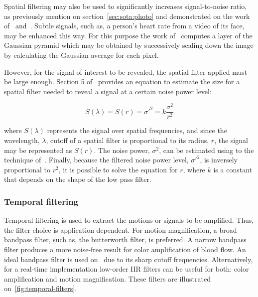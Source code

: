 Spatial filtering may also be used to significantly increases signal-to-noise
ratio, as previously mention on section~\ref{sec:sota:photo} and demonstrated
on the work of~\cite{Verkruysse2008Remote} and~\cite{Wu2012Eulerian}. Subtle
signals, such as, a person's heart rate from a video of its face, may be
enhanced this way. For this purpose the work of~\cite{Wu2012Eulerian} computes
a layer of the Gaussian pyramid which may be obtained by successively scaling
down the image by calculating the Gaussian average for each pixel.

However, for the signal of interest to be revealed, the spatial filter applied
must be large enough. Section 5 of~\cite{Wu2012Eulerian} provides an equation
to estimate the size for a spatial filter needed to reveal a signal at a
certain noise power level:

\begin{equation}
  S(\lambda) = S(r) = \sigma'^2 = k \frac{\sigma^2}{r^2}
\end{equation}

where $S(\lambda)$ represents the signal over spatial frequencies, and since
the wavelength, $\lambda$, cutoff of a spatial filter is proportional to its
radius, $r$, the signal may be represented as $S(r)$. The noise power,
$\sigma^2$, can be estimated using to the technique of~\cite{Liu2006Noise}.
Finally, because the filtered noise power level, $\sigma'^2$, is inversely
proportional to $r^2$, it is possible to solve the equation for $r$, where
$k$ is a constant that depends on the shape of the low pass filter.

\subsubsection{Temporal filtering} \label{sec:sota:post:evm:temporal}


Temporal filtering is used to extract the motions or signals to be amplified.
Thus, the filter choice is application dependent. For motion magnification,
a broad bandpass filter, such as, the butterworth filter, is preferred. A
narrow bandpass filter produces a more noise-free result for color
amplification of blood flow. An ideal bandpass filter is used
on~\cite{Wu2012Eulerian} due to its sharp cutoff frequencies. Alternatively,
for a real-time implementation low-order IIR filters can be useful for both:
color amplification and motion magnification. These filters are illustrated
on~\ref{fig:temporal-filters}.

